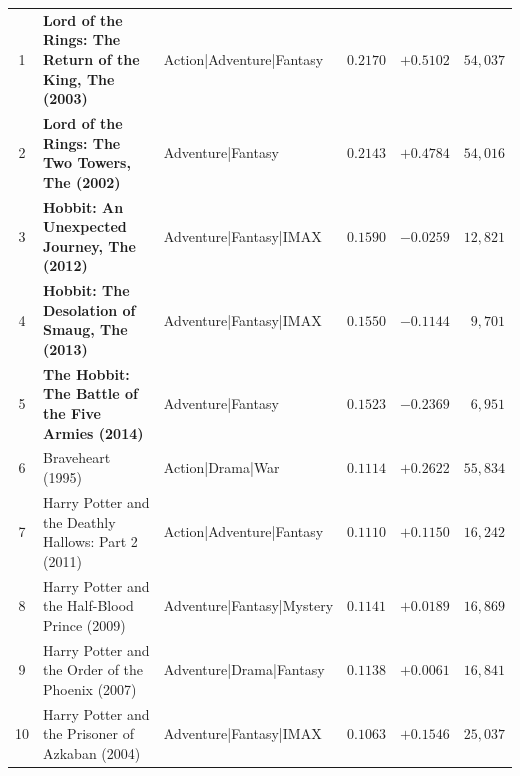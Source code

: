 \documentclass{article}
\theoremstyle{plain}
\theoremstyle{definition}
\begin{document}
\begin{table}[t]
\begin{center}
\begin{small}
\begin{tabular}{cllrrr}
1 & \textbf{Lord of the Rings: The Return of the King, The (2003)} & Action|Adventure|Fantasy & $0.2170$ & $+0.5102$ & $54,037$ \\
2 & \textbf{Lord of the Rings: The Two Towers, The (2002)} & Adventure|Fantasy & $0.2143$ & $+0.4784$ & $54,016$ \\
3 & \textbf{Hobbit: An Unexpected Journey, The (2012)} & Adventure|Fantasy|IMAX & $0.1590$ & $-0.0259$ & $12,821$ \\
4 & \textbf{Hobbit: The Desolation of Smaug, The (2013)} & Adventure|Fantasy|IMAX & $0.1550$ & $-0.1144$ & $9,701$ \\
5 & \textbf{The Hobbit: The Battle of the Five Armies (2014)} & Adventure|Fantasy & $0.1523$ & $-0.2369$ & $6,951$ \\
6 & Braveheart (1995) & Action|Drama|War & $0.1114$ & $+0.2622$ & $55,834$ \\
7 & Harry Potter and the Deathly Hallows: Part 2 (2011) & Action|Adventure|Fantasy & $0.1110$ & $+0.1150$ & $16,242$ \\
8 & Harry Potter and the Half-Blood Prince (2009) & Adventure|Fantasy|Mystery & $0.1141$ & $+0.0189$ & $16,869$ \\
9 & Harry Potter and the Order of the Phoenix (2007) & Adventure|Drama|Fantasy & $0.1138$ & $+0.0061$ & $16,841$ \\
10 & Harry Potter and the Prisoner of Azkaban (2004) & Adventure|Fantasy|IMAX & $0.1063$ & $+0.1546$ & $25,037$ \\
\bottomrule
\end{tabular}
\end{small}
\end{center}
\vskip -0.1in
\end{table}
\end{document}
